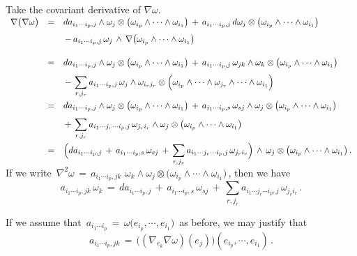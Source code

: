 \documentclass{article}[12pt,a4paper]
\begin{document}
Take the covariant derivative of $\nabla \omega$. \\[0.2in]
$\begin{array}{rcl}
\nabla\big(\nabla \omega\big) &=& \displaystyle 
	da_{i_1\cdots i_p,j} \wedge \omega_j \otimes 
	\big(\omega_{i_p} \wedge \cdots \wedge \omega_{i_1}\big) 
	\,+\, a_{i_1\cdots i_p,j}\, d\omega_j \otimes \big(\omega_{i_p} \wedge \cdots \wedge \omega_{i_1}\big) \\[0.1in]
&& \displaystyle 
	\,-\, a_{i_1\cdots i_p,j}\,\omega_j \,\wedge\, \nabla\big(\omega_{i_p} \wedge \cdots \wedge \omega_{i_1} \big) \\[0.2in]
&=& 
	\displaystyle 
	da_{i_1\cdots i_p,j} \wedge \omega_j \otimes \big(\omega_{i_p} \wedge \cdots \wedge \omega_{i_1}\big) 
	\,+\, a_{i_1\cdots i_p,j}\, \omega_{jk}\wedge \omega_k \otimes \big(\omega_{i_p} \wedge \cdots \wedge \omega_{i_1}\big) \\[0.1in]
&& \displaystyle
	\,-\, \sum_{r, j_r} a_{i_1\cdots i_p,j}\,\omega_j \wedge \omega_{i_rj_r}
	\otimes \Big(\omega_{i_p} \wedge \cdots \wedge \omega_{j_r} \wedge \cdots \wedge \omega_{i_1}\Big) \\[0.2in]
&=& \displaystyle 
	da_{i_1\cdots i_p,j} \wedge \omega_j \otimes \big(\omega_{i_p} \wedge \cdots \wedge \omega_{i_1}\big) 
	\,+\, a_{i_1\cdots i_p,s}\, \omega_{sj} \wedge \omega_j \otimes \big(\omega_{i_p} \wedge \cdots \wedge \omega_{i_1}\big) \\[0.1in]
&& \displaystyle 
	\,+\, \sum_{r, j_r} a_{i_1 \cdots j_r \cdots i_p,j}\, \omega_{j_r i_r}\wedge \omega_j 
	\otimes  \big(\omega_{i_p} \wedge \cdots \wedge \omega_{i_1}\big) \\[0.2in]
&=& \displaystyle 
	\Big(da_{i_1\cdots i_p,j} \,+\, a_{i_1\cdots i_p,s}\, \omega_{sj} 
	\,+\, \sum_{r,j_r} a_{i_1 \cdots j_r \cdots i_p,j}\, \omega_{j_r i_r} \Big)
	\,\wedge\, \omega_j \otimes \big(\omega_{i_p} \wedge \cdots \wedge \omega_{i_1}\big) \,.
\end{array}$ \\[0.1in]

If we write \,$\nabla^2 \omega \,=\, a_{i_1\cdots i_p,jk}\,\,\omega_k \wedge \omega_j 
\otimes \big(\omega_{i_p} \wedge \cdots \wedge \omega_{i_1}\big)$\,, then we have
\begin{equation}
a_{i_1\cdots i_p,jk}\,\omega_k \,=\, da_{i_1\cdots i_p,j} \,+\, a_{i_1\cdots i_p,s}\, \omega_{sj} 
	\,+\, \sum_{r,j_r} a_{i_1 \cdots j_r \cdots i_p,j}\, \omega_{j_r i_r} \,.
\end{equation}

If we assume that \,$a_{i_1\cdots i_p} \,=\, \omega\big(e_{i_p}, \cdots, e_{i_1}\big)$\, as before,
we may justify that 
$$ a_{i_1\cdots i_p, jk} \,=\, \big((\nabla_{e_k} \nabla\omega)(e_j)\big)(e_{i_p}, \cdots, e_{i_1})\,. $$
\end{document}
